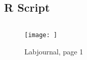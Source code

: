 \documentclass[main.tex]{subfiles}
\begin{document}
\subsection*{R Script}
\begin{lstlisting}

\end{lstlisting}

\begin{figure}[H]
    \centering
    \texttt{[image: ]}
    \caption{Labjournal, page 1}
    \label{fig:app:labjournal}
\end{figure}
\end{document}
